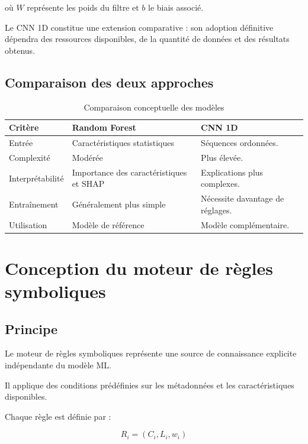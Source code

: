 où $W$ représente les poids du filtre et $b$
le biais associé.

Le CNN 1D constitue une extension comparative :
son adoption définitive dépendra des ressources
disponibles, de la quantité de données et des résultats
obtenus.

\subsection{Comparaison des deux approches}

\begin{table}[H]
\centering
\caption{Comparaison conceptuelle des modèles}
\label{tab:comparaison_ml}
\begin{tabularx}{\textwidth}{|l|X|X|}
\hline
\textbf{Critère} & \textbf{Random Forest} &
\textbf{CNN 1D} \\
\hline
Entrée &
Caractéristiques statistiques &
Séquences ordonnées. \\
\hline
Complexité &
Modérée &
Plus élevée. \\
\hline
Interprétabilité &
Importance des caractéristiques et SHAP &
Explications plus complexes. \\
\hline
Entraînement &
Généralement plus simple &
Nécessite davantage de réglages. \\
\hline
Utilisation &
Modèle de référence &
Modèle complémentaire. \\
\hline
\end{tabularx}
\end{table}

\section{Conception du moteur de règles symboliques}

\subsection{Principe}

Le moteur de règles symboliques représente une source
de connaissance explicite indépendante du modèle ML.

Il applique des conditions prédéfinies sur les métadonnées
et les caractéristiques disponibles.

Chaque règle est définie par :

\[
R_i=(C_i,L_i,w_i)
\]

